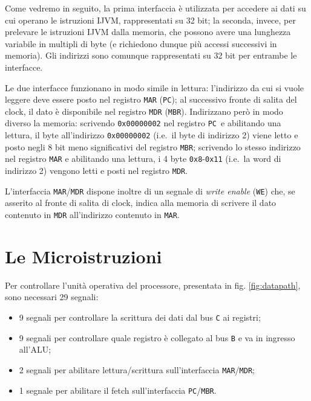 \documentclass[a4paper,12pt]{scrreprt}
\begin{document}
\begin{mynote}{}{}
  Come vedremo in seguito, la prima interfaccia è utilizzata per accedere ai
  dati su cui operano le istruzioni IJVM, rappresentati su 32 bit; la seconda,
  invece, per prelevare le istruzioni IJVM dalla memoria, che possono avere una
  lunghezza variabile in multipli di byte (e richiedono dunque più accessi
  successivi in memoria). Gli indirizzi sono comunque rappresentati su 32 bit
  per entrambe le interfacce.
\end{mynote}

Le due interfacce funzionano in modo simile in lettura: l'indirizzo da cui si
vuole leggere deve essere posto nel registro \lstinline{MAR} (\lstinline{PC});
al successivo fronte di salita del clock, il dato è disponibile nel registro
\lstinline{MDR} (\lstinline{MBR}). Indirizzano però in modo diverso la memoria:
scrivendo \lstinline{0x00000002} nel registro \lstinline{PC} e abilitando una
lettura, il byte all'indirizzo \lstinline{0x00000002} (i.e.~il byte di indirizzo
2) viene letto e posto negli 8 bit meno significativi del registro
\lstinline{MBR}; scrivendo lo stesso indirizzo nel registro \lstinline{MAR} e
abilitando una lettura, i 4 byte \lstinline{0x8}-\lstinline{0x11} (i.e.~la word
di indirizzo 2) vengono letti e posti nel registro \lstinline{MDR}.

L'interfaccia \lstinline{MAR}/\lstinline{MDR} dispone inoltre di un segnale di
\textit{write enable} (\lstinline{WE}) che, se asserito al fronte di salita di
clock, indica alla memoria di scrivere il dato contenuto in \lstinline{MDR}
all'indirizzo contenuto in \lstinline{MAR}.

\section{Le Microistruzioni}

Per controllare l'unità operativa del processore, presentata in fig.
\ref{fig:datapath}, sono necessari 29 segnali:
\begin{itemize}
    \item 9 segnali per controllare la scrittura dei dati dal bus \lstinline{C}
    ai registri;
    \item 9 segnali per controllare quale registro è collegato al bus
    \lstinline{B} e va in ingresso all'ALU;
    \item 2 segnali per abilitare lettura/scrittura sull'interfaccia
    \lstinline{MAR}/\lstinline{MDR};
    \item 1 segnale per abilitare il fetch sull'interfaccia
    \lstinline{PC}/\lstinline{MBR}.
\end{itemize}
\end{document}
